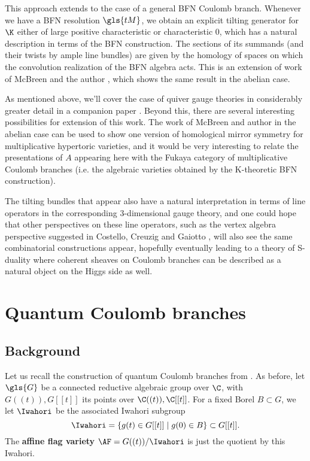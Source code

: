 This approach extends to the case of a general BFN Coulomb branch.
Whenever we have a BFN resolution $\gls{tM}$, we obtain an explicit
tilting generator for $\K$ either of large positive characteristic or
characteristic 0, which has a natural description in terms of the BFN
construction.  The sections of its summands (and their twists by ample
line bundles) are given by the homology of spaces on which the
convolution realization of the BFN algebra acts.  
This is an extension of work of McBreen and the author \cite{McBW}, which
shows the same result in the abelian case.

As mentioned above, we'll cover the case of quiver gauge theories in
considerably greater detail in a companion paper \cite{WebcohII}.
Beyond this, there are several interesting possibilities for extension of this
work.  The work of McBreen and author in the abelian case \cite{McBW} can
be used to show one version of homological mirror symmetry for
multiplicative hypertoric varieties, and it would be very interesting
to relate the presentations of $A$ appearing here with the Fukaya
category of multiplicative Coulomb branches (i.e. the algebraic
varieties obtained by the K-theoretic BFN construction).

The tilting bundles that appear also have a natural interpretation in
terms of line operators in the corresponding 3-dimensional gauge
theory, and one could hope that other perspectives on these line
operators, such as the vertex algebra perspective suggested in
Costello, Creuzig and Gaiotto \cite{CCG}, will also see the same combinatorial
constructions appear, hopefully eventually leading to a theory of
S-duality where coherent sheaves on Coulomb branches can be described
as a natural object on the Higgs side as well.

\section{Quantum Coulomb branches}

\subsection{Background}
\label{sec:background}



Let us recall the construction of quantum Coulomb branches from
\cite{WebSD}.  As before, let $\gls{G}$ be a connected reductive algebraic
group over $\C$, with $G((t)), G[[t]]$ its points over
$\C((t)), \C[[t]]$. For a fixed Borel $B\subset G$, we let $\Iwahori$
be the associated Iwahori subgroup
\[\Iwahori=\{g(t)\in G[[t]]\mid g(0)\in B\}\subset G[[t]].\]  The {\bf affine flag variety} $\AF=G((t))/\Iwahori$ is
just the quotient by this Iwahori.  


